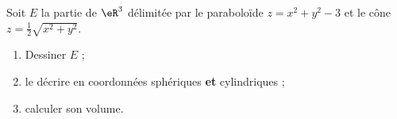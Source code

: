 \begin{exercice}\label{exoGeomAnal-0025}

Soit $E$ la partie de $\eR^3$ délimitée par le paraboloïde  $z=x^2+y^2-3$ et le cône $z=\frac{1}{2}\sqrt{x^2+y^2}$.  

\begin{enumerate}
\item Dessiner $E$ ;
\item le décrire en coordonnées  sphériques \textbf{et} cylindriques ;
\item calculer son volume.
\end{enumerate}


\end{exercice}
